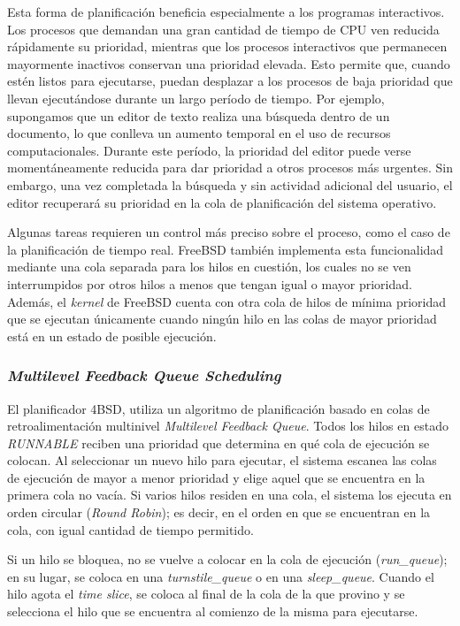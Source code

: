 Esta forma de planificación beneficia especialmente a los programas interactivos. Los procesos que demandan una gran cantidad de tiempo de CPU ven reducida rápidamente su prioridad, mientras que los procesos interactivos que permanecen mayormente inactivos conservan una prioridad elevada. Esto permite que, cuando estén listos para ejecutarse, puedan desplazar a los procesos de baja prioridad que llevan ejecutándose durante un largo período de tiempo. Por ejemplo, supongamos que un editor de texto realiza una búsqueda dentro de un documento, lo que conlleva un aumento temporal en el uso de recursos computacionales. Durante este período, la prioridad del editor puede verse momentáneamente reducida para dar prioridad a otros procesos más urgentes. Sin embargo, una vez completada la búsqueda y sin actividad adicional del usuario, el editor recuperará su prioridad en la cola de planificación del sistema operativo.\par

Algunas tareas requieren un control más preciso sobre el proceso, como el caso de la planificación de tiempo real. FreeBSD también implementa esta funcionalidad mediante una cola separada para los hilos en cuestión, los cuales no se ven interrumpidos por otros hilos a menos que tengan igual o mayor prioridad. Además, el \textit{kernel} de FreeBSD cuenta con otra cola de hilos de mínima prioridad que se ejecutan únicamente cuando ningún hilo en las colas de mayor prioridad está en un estado de posible ejecución.\par

\subsubsection{\textit{Multilevel Feedback Queue Scheduling}}

El planificador 4BSD, utiliza un algoritmo de planificación basado en colas de retroalimentación multinivel \textit{Multilevel Feedback Queue}. Todos los hilos en estado \textit{RUNNABLE} reciben una prioridad que determina en qué cola de ejecución se colocan. Al seleccionar un nuevo hilo para ejecutar, el sistema escanea las colas de ejecución de mayor a menor prioridad y elige aquel que se encuentra en la primera cola no vacía. Si varios hilos residen en una cola, el sistema los ejecuta en orden circular (\textit{Round Robin}); es decir, en el orden en que se encuentran en la cola, con igual cantidad de tiempo permitido.\par

Si un hilo se bloquea, no se vuelve a colocar en la cola de ejecución (\textit{run\_queue}); en su lugar, se coloca en una \textit{turnstile\_queue} o en una \textit{sleep\_queue}. Cuando el hilo agota el \textit{time slice}, se coloca al final de la cola de la que provino y se selecciona el hilo que se encuentra al comienzo de la misma para ejecutarse.\par

